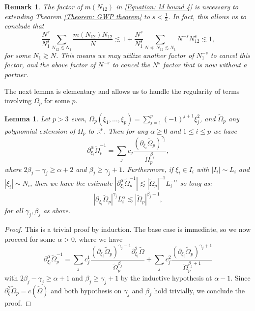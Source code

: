 \documentclass[12pt, letterpaper]{amsart}
\newtheorem{lemma}{Lemma}
\newtheorem{remark}{Remark}
\begin{document}
\begin{remark}\label{Remark: N12 M term}
    The factor of $m(N_{12})$ in \eqref{Equation: M bound 4} is necessary to extending Theorem \ref{Theorem: GWP theorem} to $s < \tfrac{1}{3}$. In fact, this allows us to conclude that
    \[
    \frac{N^s}{N_1^s}\sum_{N_{12}\lesssim N_1}\frac{m(N_{12})N_{12}}{N} \lesssim 1 + \frac{N^s}{N_1^s}\sum_{N\ll N_{12}\lesssim N_1}N^{-s}N_{12}^s\lesssim 1,
    \]
    for some $N_1\gtrsim N$. This means we may utilize another factor of $N_1^{-s}$ to cancel this factor, and the above factor of $N^{-s}$ to cancel the $N^s$ factor that is now without a partner. 
\end{remark}
The next lemma is elementary and allows us to handle the regularity of terms involving $\Omega_p$ for some $p$.
\begin{lemma}\label{Lemma: Omega derivative}
    Let $p  > 3$ even,  $\Omega_p(\xi_1,\dots,\xi_p) = \sum_{j=1}^p (-1)^{j+1}\xi_j^2$, and $\tilde{\Omega}_p$ any polynomial extension of $\Omega_p$ to $\mathbb{R}^p$. Then for any $\alpha \geq 0$ and $1\leq i\leq p$ we have \begin{equation}
        \partial_{\xi_i}^\alpha\tilde{\Omega}_p^{-1} = \sum_{j}c_j\frac{(\partial_{\xi_i}\tilde{\Omega}_p)^{\gamma_j}}{\tilde{\Omega}_p^{\beta_j}},
    \end{equation}
    where $2\beta_j - \gamma_j \geq \alpha + 2$ and $\beta_j \geq \gamma_j + 1$. Furthermore, if $\xi_i\in I_i$ with $|I_i|\sim L_i$ and $|\xi_i|\sim N_i$, then we have the estimate $|\partial^\alpha_{\xi_i} \tilde{\Omega}^{-1}_p|\lesssim |\tilde{\Omega}_p|^{-1}L_i^{-\alpha}$ so long as:
    \begin{equation}\label{Equation: Regularity Omega desired est}
        |\partial_{\xi_i}\tilde{\Omega}_p|^{\gamma_j}L^{\alpha}_i\lesssim |\tilde{\Omega}_p|^{\beta_j-1},
    \end{equation}
    for all $\gamma_j,\beta_j$ as above.
\end{lemma}
\begin{proof}
    This is a trivial proof by induction. The base case is immediate, so we now proceed for some $\alpha > 0$, where we have
    \[
    \partial_{\xi_i}^\alpha \tilde{\Omega}_p^{-1} = \sum_j c^1_j \frac{(\partial_{\xi_i}\tilde{\Omega}_p)^{\gamma_j-1}\partial_{\xi_i}^2\tilde{\Omega}}{\tilde{\Omega}_p^{\beta_j}} + \sum_j c^2_j\frac{(\partial_{\xi_i}\tilde{\Omega}_p)^{\gamma_j+1}}{\tilde{\Omega}_p^{\beta_j+1}}
    \]
    with $2\beta_j-\gamma_j\geq \alpha+1$ and $\beta_j\geq \gamma_j + 1$ by the inductive hypothesis at $\alpha - 1$. Since $\partial_{\xi}^2\tilde{\Omega}_p = c(\tilde{\Omega})$ and both hypothesis on $\gamma_j$ and $\beta_j$ hold trivially, we conclude the proof.
\end{proof}
\end{document}
